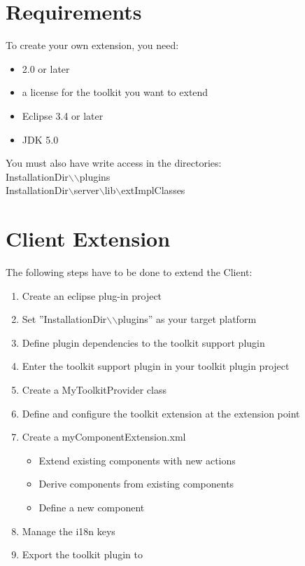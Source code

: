 \section{Requirements}
To create your own \app{} extension, you need:
\begin{itemize}
\item \app{} 2.0 or later
\item a license for the toolkit you want to extend
\item Eclipse 3.4 or later
\item JDK 5.0
\end{itemize}

You must also have write access in the directories:\\
InstallationDir$\backslash$\app{}$\backslash$plugins\\
InstallationDir$\backslash$server$\backslash$lib$\backslash$extImplClasses 

\section{\app{} Client Extension}

The following steps have to be done to extend the \app{} Client:
\begin{enumerate}
 \item Create an eclipse plug-in project
 \item Set ''InstallationDir$\backslash$\app{}$\backslash$plugins'' as your target platform
 \item Define plugin dependencies to the toolkit support plugin
 \item Enter the toolkit support plugin in your toolkit plugin project
 \item Create a MyToolkitProvider class
 \item Define and configure the toolkit extension at the extension point
 \item Create a myComponentExtension.xml
 \begin{itemize}
  \item Extend existing \app{} components with new actions
  \item Derive components from existing \app{} components
  \item Define a new component
 \end{itemize}
 \item Manage the i18n keys
 \item Export the toolkit plugin to \app{}
\end{enumerate}

